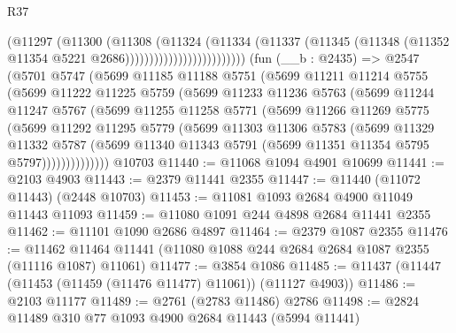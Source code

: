 \begin{lexlean}{R37}
\begin{coremodule}
                                    (@11297
                                      (@11300
                                        (@11308
                                          (@11324
                                            (@11334
                                              (@11337
                                                (@11345
                                                  (@11348
                                                    (@11352
                                                      @11354
                                                      @5221
                                                      @2686)))))))))))))))))))))))))
    (fun (__b : @2435) =>
    @2547
      (@5701
        @5747
        (@5699
          @11185
          @11188
          @5751
          (@5699
            @11211
            @11214
            @5755
            (@5699
              @11222
              @11225
              @5759
              (@5699
                @11233
                @11236
                @5763
                (@5699
                  @11244
                  @11247
                  @5767
                  (@5699
                    @11255
                    @11258
                    @5771
                    (@5699
                      @11266
                      @11269
                      @5775
                      (@5699
                        @11292
                        @11295
                        @5779
                        (@5699
                          @11303
                          @11306
                          @5783
                          (@5699
                            @11329
                            @11332
                            @5787
                            (@5699
                              @11340
                              @11343
                              @5791
                              (@5699 @11351 @11354 @5795 @5797))))))))))))))
    @10703
@11440 := @11068 @1094 @4901 @10699
@11441 := @2103 @4903
@11443 := @2379 @11441 @2355
@11447 := @11440 (@11072 @11443) (@2448 @10703)
@11453 := @11081 @1093 @2684 @4900 @11049 @11443 @11093
@11459 := @11080 @1091 @244 @4898 @2684 @11441 @2355
@11462 := @11101 @1090 @2686 @4897
@11464 := @2379 @1087 @2355
@11476 := @11462 @11464 @11441 (@11080 @1088 @244 @2684 @2684 @1087 @2355 (@11116 @1087) @11061)
@11477 := @3854 @1086
@11485 := @11437 (@11447 (@11453 (@11459 (@11476 @11477) @11061)) (@11127 @4903))
@11486 := @2103 @11177
@11489 := @2761 (@2783 @11486) @2786
@11498 := @2824 @11489 @310 @77 @1093 @4900 @2684 @11443 (@5994 @11441)

\end{coremodule}
\end{lexlean}
